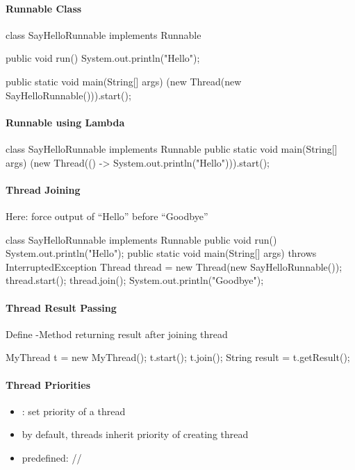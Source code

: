 \paragraph{Runnable Class}
\begin{java}
  class SayHelloRunnable implements Runnable {
    public void run() {
      System.out.println("Hello");
    }

    public static void main(String[] args) {
      (new Thread(new SayHelloRunnable())).start();
    }
  }
\end{java}

\paragraph{Runnable using Lambda}
\begin{java}
    class SayHelloRunnable implements Runnable {
      public static void main(String[] args) {
        (new Thread(() -> System.out.println("Hello"))).start();
      }
    }
\end{java}

\paragraph{Thread Joining}

Here: force output of ``Hello'' before ``Goodbye''
\begin{java}
  class SayHelloRunnable implements Runnable {
    public void run() {
      System.out.println("Hello");
    }
    public static void main(String[] args)
      throws InterruptedException {
      Thread thread = new Thread(new SayHelloRunnable());
      thread.start();
      thread.join();
      System.out.println("Goodbye");
    }
  }
\end{java}

\paragraph{Thread Result Passing}

Define -Method returning result after joining thread
\begin{java}
  MyThread t = new MyThread();
  t.start();
  t.join();
  String result = t.getResult();
\end{java}

\paragraph{Thread Priorities}
\begin{itemize}
  \item {}: set priority of a thread
  \item by default, threads inherit priority of creating thread
  \item predefined: //
\end{itemize}


